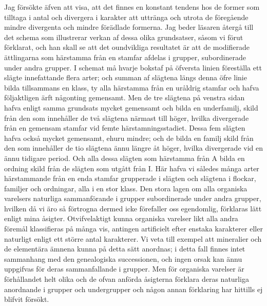 Jag försökte äfven att visa, att det finnes en konstant tendens hos de former som tilltaga i antal och divergera i karakter att uttränga och utrota de föregående mindre divergenta och mindre förädlade formerna. Jag beder läsaren återgå till det schema som illustrerar verkan af dessa olika grundsatser, såsom vi förut förklarat, och han skall se att det oundvikliga resultatet är att de modifierade ättlingarna som härstamma från en stamfar afdelas i grupper, subordinerade under andra grupper. I schemat må hvarje bokstaf på öfversta linien föreställa ett slägte innefattande flera arter; och summan af slägtena längs denna öfre linie bilda tillsammans en klass, ty alla härstamma från en uråldrig stamfar och hafva följaktligen ärft någonting gemensamt. Men de tre slägtena på venstra sidan hafva enligt samma grundsats mycket gemensamt och bilda en underfamilj, skild från den som innehåller de två slägtena närmast till höger, hvilka divergerade från en gemensam stamfar vid femte härstamningsstadiet. Dessa fem slägten hafva också mycket gemensamt, ehuru mindre; och de bilda en familj skild från den som innehåller de tio slägtena ännu längre åt höger, hvilka divergerade vid en ännu tidigare period. Och alla dessa slägten som härstamma från A bilda en ordning skild från de slägten som utgått från I. Här hafva vi således många arter härstammande från en enda stamfar grupperade i slägten och slägtena i flockar, familjer och ordningar, alla i en stor klass. Den stora lagen om alla organiska varelsers naturliga sammanförande i grupper subordinerade under andra grupper, hvilken då vi äro så förtrogna dermed icke förefaller oss egendomlig, förklaras lätt enligt mina åsigter. Otvifvelaktigt kunna organiska varelser likt alla andra föremål klassifieras på många vis, antingen artificielt efter enstaka karakterer eller naturligt enligt ett större antal karakterer. Vi veta till exempel att mineralier och de elementära ämnena kunna på detta sätt anordnas; i detta fall finnes intet sammanhang med den genealogiska successionen, och ingen orsak kan ännu uppgifvas för deras sammanfallande i grupper. Men för organiska varelser är förhållandet helt olika och de ofvan anförda åsigterna förklara deras naturliga anordnande i grupper och undergrupper och någon annan förklaring har hittills ej blifvit försökt.

